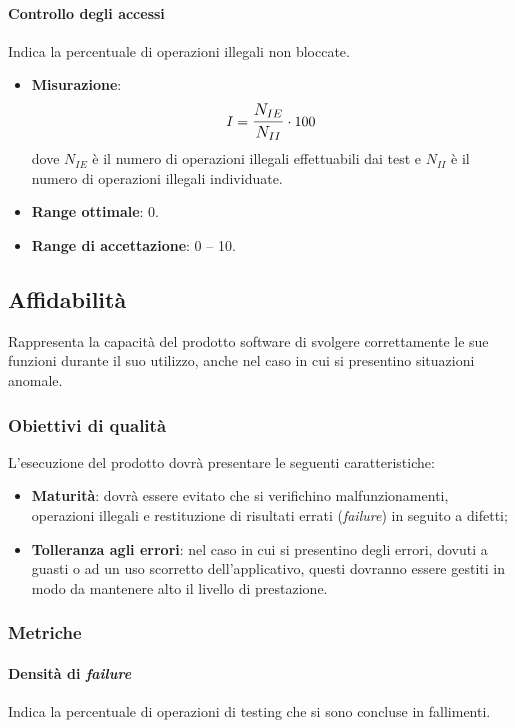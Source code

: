 \paragraph{Controllo degli accessi}
Indica la percentuale di operazioni illegali non bloccate.
\begin{itemize}
	\item \textbf{Misurazione}: 
		$$I=\mathlarger{\frac{N_{IE}}{N_{II}}} \cdot 100$$
	dove $N_{IE}$ è il numero di operazioni illegali effettuabili dai test e $N_{II}$ è il numero di operazioni illegali individuate.
	\item \textbf{Range ottimale}: 0.
	\item \textbf{Range di accettazione}: 0 -- 10.
\end{itemize}


\subsection{Affidabilità}
Rappresenta la capacità del prodotto software di svolgere correttamente le sue funzioni durante il suo utilizzo, anche nel caso in cui si presentino situazioni anomale.

\subsubsection{Obiettivi di qualità}
L'esecuzione del prodotto dovrà presentare le seguenti caratteristiche:
\begin{itemize}
\item \textbf{Maturità}: dovrà essere evitato che si verifichino malfunzionamenti, operazioni illegali e restituzione di risultati errati (\textit{failure}) in seguito a difetti;
\item \textbf{Tolleranza agli errori}: nel caso in cui si presentino degli errori, dovuti a guasti o ad un uso scorretto dell'applicativo, questi dovranno essere gestiti in modo da mantenere alto il livello di prestazione.
\end{itemize}

\subsubsection{Metriche}
\paragraph{Densità di \textit{failure}}
Indica la percentuale di operazioni di testing che si sono concluse in fallimenti.

